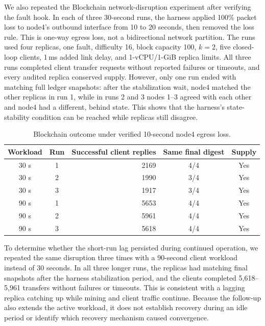 \documentclass[sigconf,a4paper]{acmart}
\begin{document}
    We also repeated the Blockchain network-disruption experiment after
    verifying the fault hook. In each of three 30-second runs, the harness
    applied 100\% packet loss to node4's outbound interface from 10 to 20
    seconds, then removed the loss rule. This is one-way egress loss, not a
    bidirectional network partition. The runs used four replicas, one fault,
    difficulty 16, block capacity 100, $k=2$, five closed-loop clients, 1\,ms
    added link delay, and 1-vCPU/1-GiB replica limits. All three runs completed
    client transfer requests without reported failures or timeouts, and every
    audited replica conserved supply. However, only one run ended with matching
    full ledger snapshots: after the stabilization wait, node4 matched the
    other replicas in run 1, while in runs 2 and 3 nodes 1--3 agreed with each
    other and node4 had a different, behind state. This shows that the
    harness's state-stability condition can be reached while replicas still
    disagree.

    \begin{table}[t]
        \centering
        \scriptsize
        \caption{Blockchain outcome under verified 10-second node4 egress loss.}
        \label{tab:blockchain-egress-loss}
        \begin{tabular}{c c r c c}
            \toprule
            \textbf{Workload} & \textbf{Run} & \textbf{Successful client replies} &
            \textbf{Same final digest} & \textbf{Supply} \\
            \midrule
            30 s & 1 & 2169 & 4/4 & Yes \\
            30 s & 2 & 1990 & 3/4 & Yes \\
            30 s & 3 & 1917 & 3/4 & Yes \\
            \midrule
            90 s & 1 & 5653 & 4/4 & Yes \\
            90 s & 2 & 5961 & 4/4 & Yes \\
            90 s & 3 & 5618 & 4/4 & Yes \\
            \bottomrule
        \end{tabular}
    \end{table}

    To determine whether the short-run lag persisted during continued
    operation, we repeated the same disruption three times with a 90-second
    client workload instead of 30 seconds. In all three longer runs, the
    replicas had matching final snapshots after the harness stabilization
    period, and the clients completed 5,618--5,961 transfers without failures
    or timeouts. This is consistent with a lagging replica catching up while
    mining and client traffic continue. Because the follow-up also extends the
    active workload, it does not establish recovery during an idle period or
    identify which recovery mechanism caused convergence.
\end{document}
